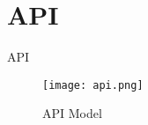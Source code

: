 \section{API}
API

\begin{figure}[ht]
    \centering
    \texttt{[image: api.png]}
    \caption{API Model}
    \label{fig::api}
\end{figure}